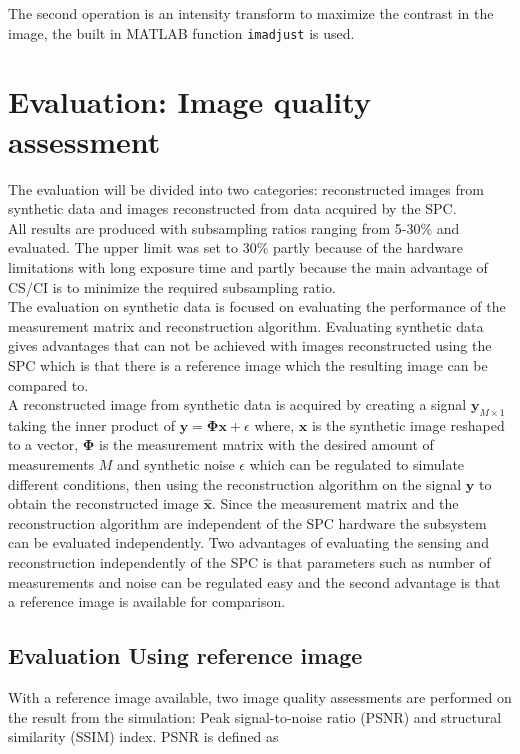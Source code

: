 The second operation is an intensity transform to maximize the contrast in the image, the built in MATLAB function \texttt{imadjust} is used.   


\section{Evaluation: Image quality assessment}
\label{sec:method_eval}
The evaluation will be divided into two categories: reconstructed images from synthetic data and images reconstructed from data acquired by the SPC.\\[0.1in] 

All results are produced with subsampling ratios ranging from 5-30\% and evaluated. The upper limit was set to 30\% partly because of the hardware limitations with long exposure time and partly because the main advantage of CS/CI is to minimize the required subsampling ratio.\\[0.1in]

The evaluation on synthetic data is focused on evaluating the performance of the measurement matrix and reconstruction algorithm. Evaluating synthetic data gives advantages that can not be achieved with images reconstructed using the SPC which is that there is a reference image which the resulting image can be compared to.\\[0.1in]

A reconstructed image from synthetic data is acquired by creating a signal $ \mathbf{ y }_{M\times1}$ taking the inner product of $ \mathbf{y} = \mathbf{\Phi} \mathbf{x} + \epsilon$ where, $\mathbf{x}$ is the synthetic image reshaped to a vector, $\mathbf{\Phi}$ is the measurement matrix with the desired amount of measurements $M$ and synthetic noise $\epsilon$ which can be regulated to simulate different conditions, then using the reconstruction algorithm on the signal $\mathbf{y}$ to obtain the reconstructed image $\mathbf{\hat x}$. Since the measurement matrix and the reconstruction algorithm are independent of the SPC hardware the subsystem can be evaluated independently. Two advantages of evaluating the sensing and reconstruction independently of the SPC is that parameters such as number of measurements and noise can be regulated easy and the second advantage is that a reference image is available for comparison.\\[0.1in] 

\subsection{Evaluation Using reference image}
With a reference image available, two image quality assessments are performed on the result from the simulation: Peak signal-to-noise ratio (PSNR) and structural similarity (SSIM) index. PSNR is defined as

